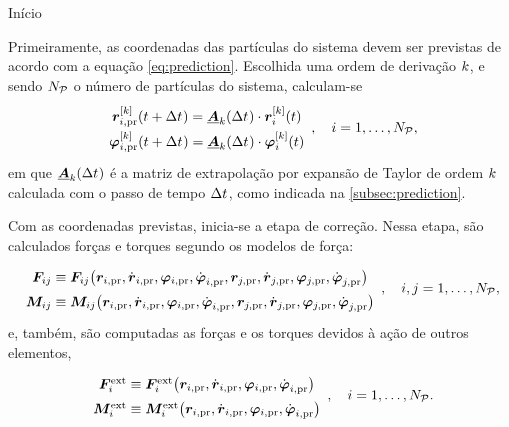 \alert{Início}

Primeiramente, as coordenadas das partículas do sistema devem ser previstas de acordo com a equação \eqref{eq:prediction}. Escolhida uma ordem de derivação \(k\), e sendo \(N_{\mathcal{P}}\) o número de partículas do sistema, calculam-se
\begin{equation} \label{eq:position_and_orientation_prediction}
	\def\arraystretch{1.5}
	\begin{array}{c}
		\drvec{\taylorOrder}{\positionipr}\pqty{t+\Dt} = \extrapolationMatrix{\taylorOrder}[\Dt]\cdot\drvec{\taylorOrder}{\positioni}\pqty{t} \\
		\drvec{\taylorOrder}{\orientationipr}\pqty{t+\Dt} = \extrapolationMatrix{\taylorOrder}[\Dt]\cdot\drvec{\taylorOrder}{\orientationi}\pqty{t} \\
	\end{array}, \quad i = 1, \dotsc, \numberOfParticles,
\end{equation}
em que \(\extrapolationMatrix{\taylorOrder}[\Dt]\) é a matriz de extrapolação por expansão de Taylor de ordem \(k\) calculada com o passo de tempo \(\Delta t_{}\), como indicada na \autoref{subsec:prediction}.

Com as coordenadas previstas, inicia-se a etapa de correção. Nessa etapa, são calculados forças e torques segundo os modelos de força:
\begin{equation*}
	\def\arraystretch{1.5}
	\begin{array}{c}
		\forceij \equiv \forceij\pqty{\positionipr, \velocityipr, \orientationipr, \dorientationipr{1}, \positionjpr, \velocityjpr, \orientationjpr, \dorientationjpr{1}} \\
		\torqueij \equiv \torqueij\pqty{\positionipr, \velocityipr, \orientationipr, \dorientationipr{1}, \positionjpr, \velocityjpr, \orientationjpr, \dorientationjpr{1}}
	\end{array}, \quad i,j = 1, \dotsc, \numberOfParticles,
\end{equation*}
e, também, são computadas as forças e os torques devidos à ação de outros elementos,
\begin{equation*}
	\def\arraystretch{1.5}
	\begin{array}{c}
		\external\forcei \equiv \external\forcei\pqty{\positionipr, \velocityipr, \orientationipr, \dorientationipr{1}} \\
		\external\torquei \equiv \external\torquei\pqty{\positionipr, \velocityipr, \orientationipr, \dorientationipr{1}} \\
	\end{array}, \quad i = 1, \dotsc, \numberOfParticles.
\end{equation*}
\begin{equation*}
\end{equation*}

